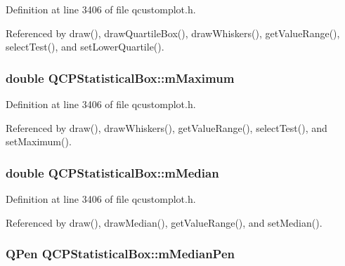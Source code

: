 Definition at line 3406 of file qcustomplot.\+h.



Referenced by draw(), draw\+Quartile\+Box(), draw\+Whiskers(), get\+Value\+Range(), select\+Test(), and set\+Lower\+Quartile().

\hypertarget{class_q_c_p_statistical_box_a16266f1e0e4e8e95b5d141c49479ef2e}{}
\subsubsection[{m\+Maximum}]{\setlength{\rightskip}{0pt plus 5cm}double Q\+C\+P\+Statistical\+Box\+::m\+Maximum\hspace{0.3cm}{\ttfamily [protected]}}\label{class_q_c_p_statistical_box_a16266f1e0e4e8e95b5d141c49479ef2e}


Definition at line 3406 of file qcustomplot.\+h.



Referenced by draw(), draw\+Whiskers(), get\+Value\+Range(), select\+Test(), and set\+Maximum().

\hypertarget{class_q_c_p_statistical_box_ae43287ca13c8166bde2ac19bf0969d23}{}
\subsubsection[{m\+Median}]{\setlength{\rightskip}{0pt plus 5cm}double Q\+C\+P\+Statistical\+Box\+::m\+Median\hspace{0.3cm}{\ttfamily [protected]}}\label{class_q_c_p_statistical_box_ae43287ca13c8166bde2ac19bf0969d23}


Definition at line 3406 of file qcustomplot.\+h.



Referenced by draw(), draw\+Median(), get\+Value\+Range(), and set\+Median().

\hypertarget{class_q_c_p_statistical_box_a1af5b601049c575f778ae270f40c9443}{}
\subsubsection[{m\+Median\+Pen}]{\setlength{\rightskip}{0pt plus 5cm}Q\+Pen Q\+C\+P\+Statistical\+Box\+::m\+Median\+Pen\hspace{0.3cm}{\ttfamily [protected]}}\label{class_q_c_p_statistical_box_a1af5b601049c575f778ae270f40c9443}


